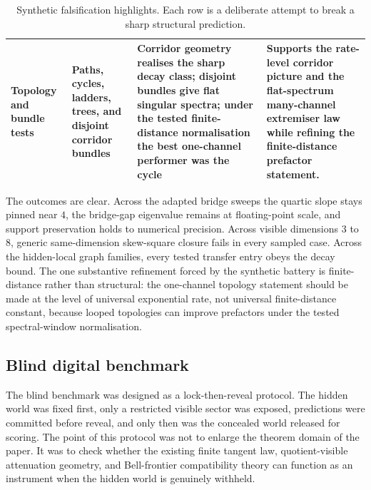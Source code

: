 \documentclass[11pt]{article}
\numberwithin{equation}{section}
\theoremstyle{thmcompact}
\theoremstyle{remark}
\begin{document}
\begin{table}[H]
\begin{tabularx}{\textwidth}{>{\raggedright\arraybackslash}p{3.1cm} >{\raggedright\arraybackslash}p{4.0cm} Y Y}
Topology and bundle tests & Paths, cycles, ladders, trees, and disjoint corridor bundles & Corridor geometry realises the sharp decay class; disjoint bundles give flat singular spectra; under the tested finite-distance normalisation the best one-channel performer was the cycle & Supports the rate-level corridor picture and the flat-spectrum many-channel extremiser law while refining the finite-distance prefactor statement.\\
\bottomrule
\end{tabularx}
\caption{Synthetic falsification highlights. Each row is a deliberate attempt to break a sharp structural prediction.}
\label{tab:falsification_battery}
\end{table}

The outcomes are clear. Across the adapted bridge sweeps the quartic slope stays pinned near $4$, the bridge-gap eigenvalue remains at floating-point scale, and support preservation holds to numerical precision. Across visible dimensions $3$ to $8$, generic same-dimension skew-square closure fails in every sampled case. Across the hidden-local graph families, every tested transfer entry obeys the decay bound. The one substantive refinement forced by the synthetic battery is finite-distance rather than structural: the one-channel topology statement should be made at the level of universal exponential rate, not universal finite-distance constant, because looped topologies can improve prefactors under the tested spectral-window normalisation.

\subsection{Blind digital benchmark}

The blind benchmark was designed as a lock-then-reveal protocol. The hidden world was fixed first, only a restricted visible sector was exposed, predictions were committed before reveal, and only then was the concealed world released for scoring. The point of this protocol was not to enlarge the theorem domain of the paper. It was to check whether the existing finite tangent law, quotient-visible attenuation geometry, and Bell-frontier compatibility theory can function as an instrument when the hidden world is genuinely withheld.
\end{document}
